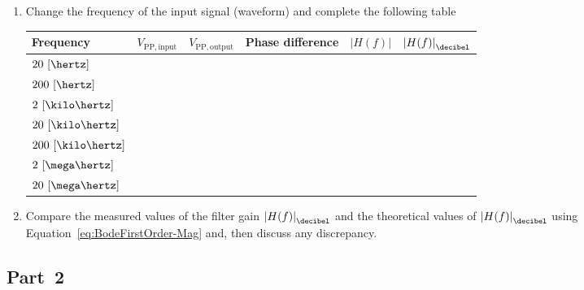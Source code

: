 \begin{enumerate}
  
\item Change the frequency of the input signal (waveform) and complete the following table
%
    \begin{center}
    \begin{tabular}{l|c|c|c|c|c}
      \toprule
      Frequency &  $V_{\mathrm{PP,input}}$ & $V_{\mathrm{PP,output}}$ & Phase difference & $\left |H(f) \right |$ & $\left |H(f) \right |_{\decibel}$\\
      \toprule
      $20~[\hertz]$ & ~ & ~ & ~ & ~ & ~\\
      $200~[\hertz]$ & ~ & ~ & ~ & ~ & ~\\
      $2~[\kilo\hertz]$ & ~ & ~ & ~ & ~ & ~\\
      $20~[\kilo\hertz]$ & ~ & ~ & ~ & ~ & ~\\
      $200~[\kilo\hertz]$ & ~ & ~ & ~ & ~ & ~\\
      $2~[\mega\hertz]$ & ~ & ~ & ~ & ~ & ~\\
      $20~[\mega\hertz]$ & ~ & ~ & ~ & ~ & ~\\      
      \bottomrule
    \end{tabular}    
  \end{center}
%  
\item Compare the measured values of the filter gain $\left|H(f)\right |_{\decibel}$ and the theoretical values of $\left|H(f)\right |_{\decibel}$ using Equation~\eqref{eq:BodeFirstOrder-Mag} and, then discuss any discrepancy.   

 \end{enumerate}


 \subsection{Part~2}
\label{sec:part2}


